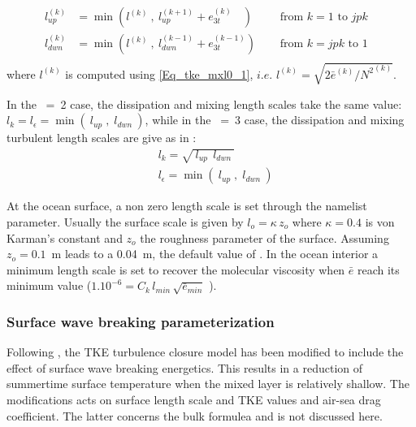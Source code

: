 \documentclass[NEMO_book]{subfiles}
\begin{document}
\begin{equation} \label{Eq_tke_mxl2}
\begin{aligned}
 l_{up\ \ }^{(k)} &= \min \left(  l^{(k)} \ , \ l_{up}^{(k+1)} + e_{3t}^{(k)}\ \ \ \;  \right)
    \quad &\text{ from $k=1$ to $jpk$ }\ \\
 l_{dwn}^{(k)} &= \min \left(  l^{(k)} \ , \ l_{dwn}^{(k-1)} + e_{3t}^{(k-1)}  \right)   
    \quad &\text{ from $k=jpk$ to $1$ }\ \\
\end{aligned}
\end{equation}
where $l^{(k)}$ is computed using \eqref{Eq_tke_mxl0_1}, 
$i.e.$ $l^{(k)} = \sqrt {2 {\bar e}^{(k)} / {N^2}^{(k)} }$.

In the ~=~2 case, the dissipation and mixing length scales take the same 
value: $ l_k=  l_\epsilon = \min \left(\ l_{up} \;,\;  l_{dwn}\ \right)$, while in the 
~=~3 case, the dissipation and mixing turbulent length scales are give 
as in \citet{Gaspar1990}:
\begin{equation} \label{Eq_tke_mxl_gaspar}
\begin{aligned}
& l_k          = \sqrt{\  l_{up} \ \ l_{dwn}\ }  	\\
& l_\epsilon = \min \left(\ l_{up} \;,\;  l_{dwn}\ \right) 
\end{aligned}
\end{equation}

At the ocean surface, a non zero length scale is set through the   namelist 
parameter. Usually the surface scale is given by $l_o = \kappa \,z_o$ 
where $\kappa = 0.4$ is von Karman's constant and $z_o$ the roughness 
parameter of the surface. Assuming $z_o=0.1$~m \citep{Craig_Banner_JPO94} 
leads to a 0.04~m, the default value of . In the ocean interior 
a minimum length scale is set to recover the molecular viscosity when $\bar{e}$ 
reach its minimum value ($1.10^{-6}= C_k\, l_{min} \,\sqrt{\bar{e}_{min}}$ ).


\subsubsection{Surface wave breaking parameterization}
Following \citet{Mellor_Blumberg_JPO04}, the TKE turbulence closure model has been modified 
to include the effect of surface wave breaking energetics. This results in a reduction of summertime 
surface temperature when the mixed layer is relatively shallow. The \citet{Mellor_Blumberg_JPO04} 
modifications acts on surface length scale and TKE values and air-sea drag coefficient. 
The latter concerns the bulk formulea and is not discussed here. 
\end{document}
